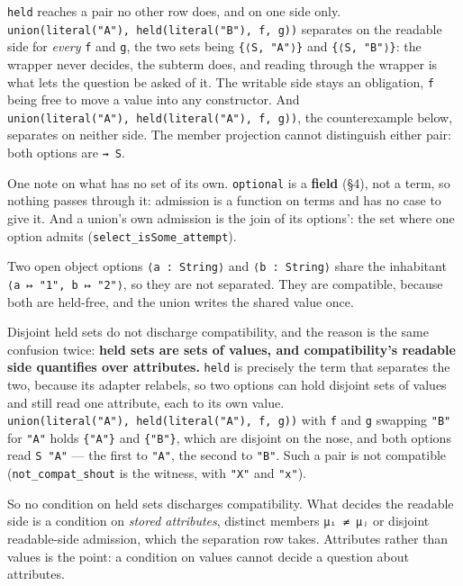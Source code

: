 \texttt{held} reaches a pair no other row does, and on one side only.
\texttt{union(literal("A"),\ held(literal("B"),\ f,\ g))} separates on the readable side for \emph{every} \texttt{f} and
\texttt{g}, the two sets being \texttt{\{⟨S,\ "A"⟩\}} and \texttt{\{⟨S,\ "B"⟩\}}: the wrapper never decides, the subterm does,
and reading through the wrapper is what lets the question be asked of it. The writable side stays an
obligation, \texttt{f} being free to move a value into any constructor. And
\texttt{union(literal("A"),\ held(literal("A"),\ f,\ g))}, the counterexample below, separates on neither
side. The member projection cannot distinguish either pair: both options are \texttt{⇝\ S}.

One note on what has no set of its own. \texttt{optional} is a \textbf{field} (§4), not a term,
so nothing passes through it: admission is a function on terms and has no case to give it. And a
union's own admission is the join of its options': the set where one option admits
(\texttt{select\_isSome\_attempt}).

Two open object options \texttt{⟨a\ :\ String⟩} and \texttt{⟨b\ :\ String⟩} share the inhabitant
\texttt{⟨a\ ↦\ "1",\ b\ ↦\ "2"⟩}, so they are not separated. They are compatible, because both are
held-free, and the union writes the shared value once.

Disjoint held sets do not discharge compatibility, and the reason is the same confusion twice:
\textbf{held sets are sets of values, and compatibility's readable side quantifies over attributes.}
\texttt{held} is precisely the term that separates the two, because its adapter relabels, so two options can
hold disjoint sets of values and still read one attribute, each to its own value.
\texttt{union(literal("A"),\ held(literal("A"),\ f,\ g))} with \texttt{f} and \texttt{g} swapping \texttt{"B"} for \texttt{"A"} holds
\texttt{\{"A"\}} and \texttt{\{"B"\}}, which are disjoint on the nose, and both options read \texttt{S\ "A"} — the first to
\texttt{"A"}, the second to \texttt{"B"}. Such a pair is not compatible (\texttt{not\_compat\_shout} is the witness,
with \texttt{"X"} and \texttt{"x"}).

So no condition on held sets discharges compatibility. What decides the readable side is a condition
on \emph{stored attributes}, distinct members \texttt{μᵢ\ ≠\ μⱼ} or disjoint readable-side admission, which
the separation row takes. Attributes rather than values is the point: a condition on values cannot
decide a question about attributes.

